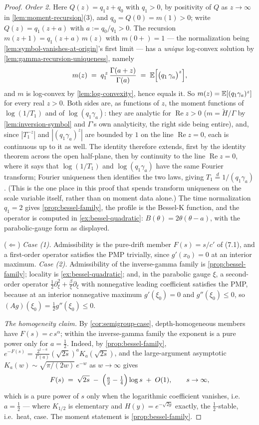 \begin{proof}
\emph{Order 2.} Here $Q(z) = q_1 z + q_0$ with $q_1 > 0$, by positivity of $Q$ as
$z \to \infty$ in \ref{lem:moment-recursion}(3), and $q_0 = Q(0) = m(1) > 0$; write
$Q(z) = q_1(z + a)$ with $a := q_0/q_1 > 0$. The recursion $m(z+1) = q_1(z+a)\,m(z)$ with
$m(0{+}) = 1$ --- the normalization being \ref{lem:symbol-vanishes-at-origin}'s first limit ---
has a \emph{unique} log-convex solution by \ref{lem:gamma-recursion-uniqueness}, namely
\[
  m(z) \;=\; q_1^{\,z}\,\frac{\Gamma(a + z)}{\Gamma(a)}
  \;=\; \mathbb{E}\Bigl[\bigl(q_1\,\gamma_a\bigr)^{z}\Bigr],
\]
and $m$ is log-convex by \ref{lem:log-convexity}, hence equals it. So $m(z) = \mathbb{E}[(q_1\gamma_a)^z]$
for every real $z > 0$. Both sides are, as functions of $z$, the moment functions of
$\log(1/T_1)$ and of $\log(q_1\gamma_a)$: they are analytic for $\operatorname{Re} z > 0$
($m = \tilde H/\Gamma$ by \ref{lem:inversion-symbol} and $\Gamma$'s own analyticity, the right
side being entire), and, since $|T_1^{-z}|$ and $|(q_1\gamma_a)^z|$ are bounded by $1$ on the
line $\operatorname{Re} z = 0$, each is continuous up to it as well. The identity therefore
extends, first by the identity theorem across the open half-plane, then by continuity to the
line $\operatorname{Re} z = 0$, where it says that $\log(1/T_1)$ and $\log(q_1\gamma_a)$ have
the same Fourier transform; Fourier uniqueness then identifies the two laws, giving
$T_1 \stackrel{d}{=} 1/(q_1\gamma_a)$. (This is the one place in this proof that spends
transform uniqueness on the scale variable itself, rather than on moment data alone.) The time
normalization $q_1 = 2$ gives \ref{prop:bessel-family}, the profile is the
Bessel-K function, and the operator is computed in \ref{ex:bessel-quadratic}: $B(\theta) =
2\theta(\theta - a)$, with the parabolic-gauge form as displayed.

($\Leftarrow$) \emph{Case (1).} Admissibility is the pure-drift member $F(s) = s/c'$ of (7.1),
and a first-order operator satisfies the PMP trivially, since $g'(x_0) = 0$ at an interior
maximum. \emph{Case (2).} Admissibility of the inverse-gamma family is
\ref{prop:bessel-family}; locality is \ref{ex:bessel-quadratic}; and, in the parabolic gauge
$\xi$, a second-order operator $\tfrac12\partial_\xi^2 + \tfrac{\beta}{\xi}\partial_\xi$ with
nonnegative leading coefficient satisfies the PMP, because at an interior nonnegative maximum
$g'(\xi_0) = 0$ and $g''(\xi_0) \le 0$, so $(Ag)(\xi_0) = \tfrac12 g''(\xi_0) \le 0$.

\emph{The homogeneity claim.} By \ref{cor:semigroup-case}, depth-homogeneous members have
$F(s) = c\,s^{\alpha}$; within the inverse-gamma family the exponent is a pure power only for
$a = \tfrac12$. Indeed, by \ref{prop:bessel-family}, $e^{-F(s)} =
\tfrac{2^{1-a}}{\Gamma(a)}(\sqrt{2s})^a K_a(\sqrt{2s})$, and the large-argument asymptotic
$K_a(w) \sim \sqrt{\pi/(2w)}\,e^{-w}$ as $w \to \infty$ gives
\[
  F(s) \;=\; \sqrt{2s} \;-\; \Bigl(\tfrac a2 - \tfrac14\Bigr)\log s \;+\; O(1),
  \qquad s \to \infty,
\]
which is a pure power of $s$ only when the logarithmic coefficient vanishes, i.e.\
$a = \tfrac12$ --- where $K_{1/2}$ is elementary and $H(y) = e^{-\sqrt{2y}}$ exactly, the
$\tfrac12$-stable, i.e.\ heat, case. The moment statement is \ref{prop:bessel-family}.
\end{proof}

